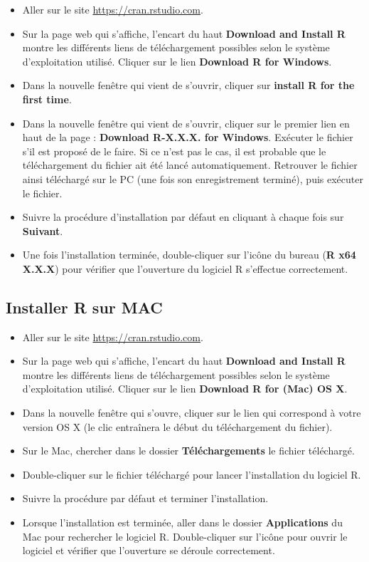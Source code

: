 \documentclass[
  french,
]{book}
\providecommand{\tightlist}{%
  \setlength{\itemsep}{0pt}\setlength{\parskip}{0pt}}
\begin{document}
\begin{itemize}
\tightlist
\item
  Aller sur le site \url{https://cran.rstudio.com}.
\item
  Sur la page web qui s'affiche, l'encart du haut \textbf{Download and Install R} montre les différents liens de téléchargement possibles selon le système d'exploitation utilisé. Cliquer sur le lien \textbf{Download R for Windows}.
\item
  Dans la nouvelle fenêtre qui vient de s'ouvrir, cliquer sur \textbf{install R for the first time}.
\item
  Dans la nouvelle fenêtre qui vient de s'ouvrir, cliquer sur le premier lien en haut de la page : \textbf{Download R-X.X.X. for Windows}. Exécuter le fichier s'il est proposé de le faire. Si ce n'est pas le cas, il est probable que le téléchargement du fichier ait été lancé automatiquement. Retrouver le fichier ainsi téléchargé sur le PC (une fois son enregistrement terminé), puis exécuter le fichier.
\item
  Suivre la procédure d'installation par défaut en cliquant à chaque fois sur \textbf{Suivant}.
\item
  Une fois l'installation terminée, double-cliquer sur l'icône du bureau (\textbf{R x64 X.X.X}) pour vérifier que l'ouverture du logiciel R s'effectue correctement.
\end{itemize}

\hypertarget{installer-r-sur-mac}{%
\subsection{Installer R sur MAC}\label{installer-r-sur-mac}}

\begin{itemize}
\tightlist
\item
  Aller sur le site \url{https://cran.rstudio.com}.
\item
  Sur la page web qui s'affiche, l'encart du haut \textbf{Download and Install R} montre les différents liens de téléchargement possibles selon le système d'exploitation utilisé. Cliquer sur le lien \textbf{Download R for (Mac) OS X}.
\item
  Dans la nouvelle fenêtre qui s'ouvre, cliquer sur le lien qui correspond à votre version OS X (le clic entraînera le début du téléchargement du fichier).
\item
  Sur le Mac, chercher dans le dossier \textbf{Téléchargements} le fichier téléchargé.
\item
  Double-cliquer sur le fichier téléchargé pour lancer l'installation du logiciel R.
\item
  Suivre la procédure par défaut et terminer l'installation.
\item
  Lorsque l'installation est terminée, aller dans le dossier \textbf{Applications} du Mac pour rechercher le logiciel R. Double-cliquer sur l'icône pour ouvrir le logiciel et vérifier que l'ouverture se déroule correctement.
\end{itemize}
\end{document}
